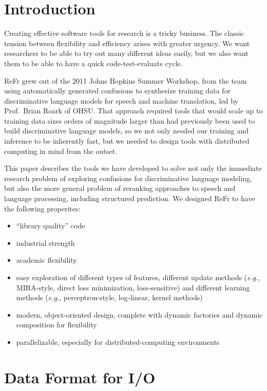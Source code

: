 \documentclass[a4paper]{article}
\begin{document}
%
\section{Introduction}

Creating effective software tools for research is a tricky business.
The classic tension between flexibility and efficiency arises with
greater urgency. We want researchers to be able to try out many
different ideas easily, but we also want them to be able to have a
quick code-test-evaluate cycle.

ReFr grew out of the 2011 Johns Hopkins Summer Workshop, from the team
using automatically generated confusions to synthesize training data
for discriminative language models for speech and machine translation,
led by Prof.\ Brian Roark of OHSU.  That approach required tools that
would scale up to training data sizes orders of magnitude larger than
had previously been used to build discriminative language models, so
we not only needed our training and inference to be inherently fast,
but we needed to design tools with distributed computing in mind from
the outset.

This paper describes the tools we have developed to solve not only the
immediate research problem of exploring confusions for discriminative
language modeling, but also the more general problem of reranking
approaches to speech and language processing, including structured
prediction. We designed ReFr to have the following properites:
\begin{itemize}[noitemsep]
\item ``library quality'' code
\item industrial strength
\item academic flexibility
\item easy exploration of different types of features, different
  update methods (\emph{e.g.}, MIRA-style, direct loss minimization,
  loss-sensitive) and different learning methods (\emph{e.g.},
  perceptron-style, log-linear, kernel methods)
\item modern, object-oriented design, complete with dynamic factories
  and dynamic composition for flexibility
\item parallelizable, especially for distributed-computing
  environments
\end{itemize}
\section{Data Format for I/O}
\end{document}
